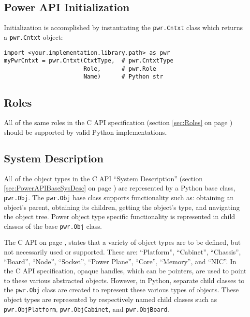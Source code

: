 \subsection{Power API Initialization}\label{sec:PythonPowerAPIInitialization}
Initialization is accomplished by instantiating the \texttt{pwr.Cntxt} class
which returns a \texttt{pwr.Cntxt} object:

\begin{center}\begin{minipage}{.95\linewidth}\begin{lstlisting}
import <your.implementation.library.path> as pwr
myPwrCntxt = pwr.Cntxt(CtxtType,  # pwr.CntxtType
                       Role,      # pwr.Role
                       Name)      # Python str
\end{lstlisting}\end{minipage}\end{center}

\subsection{Roles}\label{sec:PythonRoles}
All of the same roles in the C API specification (section \ref{sec:Roles} on
page \pageref{sec:Roles}) should be supported by valid Python implementations.

\subsection{System Description}\label{sec:PythonSystemDescription}

All of the object types in the C API ``System Description'' (section
\ref{sec:PowerAPIBaseSysDesc}  on page \pageref{sec:PowerAPIBaseSysDesc}) are
represented by a Python base class, \texttt{pwr.Obj}. The \texttt{pwr.Obj} base
class supports functionality such as: obtaining an object's parent, obtaining
its children, getting the object's type, and navigating the object tree. Power
object type specific functionality is represented in child classes of the base
\texttt{pwr.Obj} class.

The C API on page \pageref{sec:PowerAPIBaseSysDesc}, states that a variety
of object types are to be defined, but not necessarily used or supported. These
are: ``Platform'', ``Cabinet'', ``Chassis'', ``Board'', ``Node'', ``Socket'',
``Power Plane'', ``Core'', ``Memory'', and ``NIC''. In the C API specification,
opaque handles, which can be pointers, are used to point to these various abstracted
objects.  However, in Python, separate child classes to the \texttt{pwr.Obj} class
are created to represent these various types of objects. These object types are
represented by respectively named child classes such as
\texttt{pwr.ObjPlatform}, \texttt{pwr.ObjCabinet}, and \texttt{pwr.ObjBoard}.

